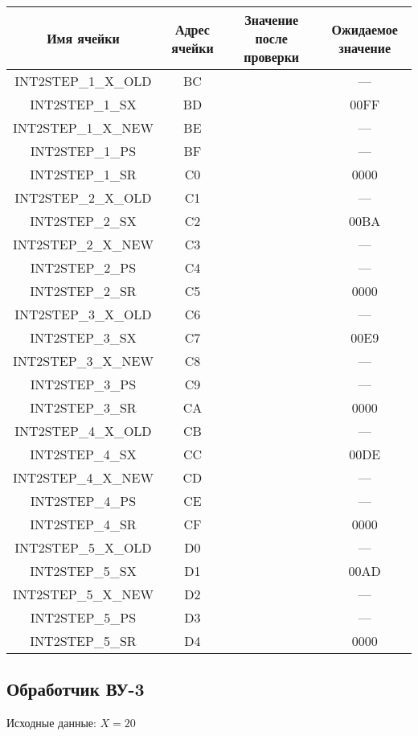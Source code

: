 \begin{center}
	\begin{tabular}{|c|c|c|c|}
		\hline
		Имя ячейки & Адрес ячейки & Значение после проверки & Ожидаемое значение \\
		\hline \hline
		INT2STEP\_1\_X\_OLD & BC &  & --- \\\hline
		INT2STEP\_1\_SX & BD &  & 00FF \\\hline
		INT2STEP\_1\_X\_NEW & BE &  & --- \\\hline
		INT2STEP\_1\_PS & BF &  & --- \\\hline
		INT2STEP\_1\_SR & C0 &  & 0000 \\\hline
		INT2STEP\_2\_X\_OLD & C1 &  & --- \\\hline
		INT2STEP\_2\_SX & C2 &  & 00BA \\\hline
		INT2STEP\_2\_X\_NEW & C3 &  & --- \\\hline
		INT2STEP\_2\_PS & C4 &  & --- \\\hline
		INT2STEP\_2\_SR & C5 &  & 0000 \\\hline
		INT2STEP\_3\_X\_OLD & C6 &  & --- \\\hline
		INT2STEP\_3\_SX & C7 &  & 00E9 \\\hline
		INT2STEP\_3\_X\_NEW & C8 &  & --- \\\hline
		INT2STEP\_3\_PS & C9 &  & --- \\\hline
		INT2STEP\_3\_SR & CA &  & 0000 \\\hline
		INT2STEP\_4\_X\_OLD & CB &  & --- \\\hline
		INT2STEP\_4\_SX & CC &  & 00DE \\\hline
		INT2STEP\_4\_X\_NEW & CD &  & --- \\\hline
		INT2STEP\_4\_PS & CE &  & --- \\\hline
		INT2STEP\_4\_SR & CF &  & 0000 \\\hline
		INT2STEP\_5\_X\_OLD & D0 &  & --- \\\hline
		INT2STEP\_5\_SX & D1 &  & 00AD \\\hline
		INT2STEP\_5\_X\_NEW & D2 &  & --- \\\hline
		INT2STEP\_5\_PS & D3 &  & --- \\\hline
		INT2STEP\_5\_SR & D4 &  & 0000 \\\hline
		
		\hline
	\end{tabular}
\end{center}

\newpage
\subsection{Обработчик ВУ-3}
\noindent Исходные данные: $ X = 20 $\\


